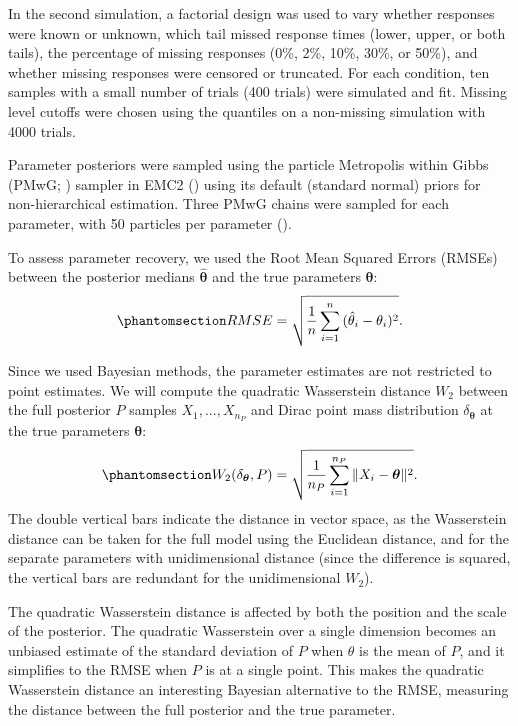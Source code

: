 \documentclass[
  man,
  floatsintext,
  longtable,
  nolmodern,
  notxfonts,
  notimes,
  colorlinks=true,linkcolor=blue,citecolor=blue,urlcolor=blue]{apa7}
\begin{document}
In the second simulation, a factorial design was used to vary whether
responses were known or unknown, which tail missed response times
(lower, upper, or both tails), the percentage of missing responses (0\%,
2\%, 10\%, 30\%, or 50\%), and whether missing responses were censored
or truncated. For each condition, ten samples with a small number of
trials (400 trials) were simulated and fit. Missing level cutoffs were
chosen using the quantiles on a non-missing simulation with 4000 trials.

Parameter posteriors were sampled using the particle Metropolis within
Gibbs (PMwG; ) sampler in EMC2
() using its default
(standard normal) priors for non-hierarchical estimation. Three PMwG
chains were sampled for each parameter, with 50 particles per parameter
().

To assess parameter recovery, we used the Root Mean Squared Errors
(RMSEs) between the posterior medians \(\boldsymbol{\hat{\theta}}\) and
the true parameters \(\boldsymbol{\theta}\):
\begin{equation}\phantomsection\label{eq-RMSE}{
RMSE = \sqrt{\frac{1}{n}\sum_{i=1}^{n}{(\hat{\theta}_i - \theta_i)^2}}.
}\end{equation}

Since we used Bayesian methods, the parameter estimates are not
restricted to point estimates. We will compute the quadratic Wasserstein
distance \(W_2\) between the full posterior \(P\) samples
\(X_1,...,X_{n_P}\) and Dirac point mass distribution
\(\delta_{\boldsymbol{\theta}}\) at the true parameters
\(\boldsymbol{\theta}\):
\begin{equation}\phantomsection\label{eq-Wasserstein}{
W_2(\delta_{\boldsymbol{\theta}}, P) = \sqrt{\frac{1}{n_P} \sum_{i=1}^{n_P}{\|X_i - \boldsymbol{\theta}\|^2}}.
}\end{equation} The double vertical bars indicate the distance in vector
space, as the Wasserstein distance can be taken for the full model using
the Euclidean distance, and for the separate parameters with
unidimensional distance (since the difference is squared, the vertical
bars are redundant for the unidimensional \(W_2\)).

The quadratic Wasserstein distance is affected by both the position and
the scale of the posterior. The quadratic Wasserstein over a single
dimension becomes an unbiased estimate of the standard deviation of
\(P\) when \(\theta\) is the mean of \(P\), and it simplifies to the
RMSE when \(P\) is at a single point. This makes the quadratic
Wasserstein distance an interesting Bayesian alternative to the RMSE,
measuring the distance between the full posterior and the true
parameter.
\end{document}
